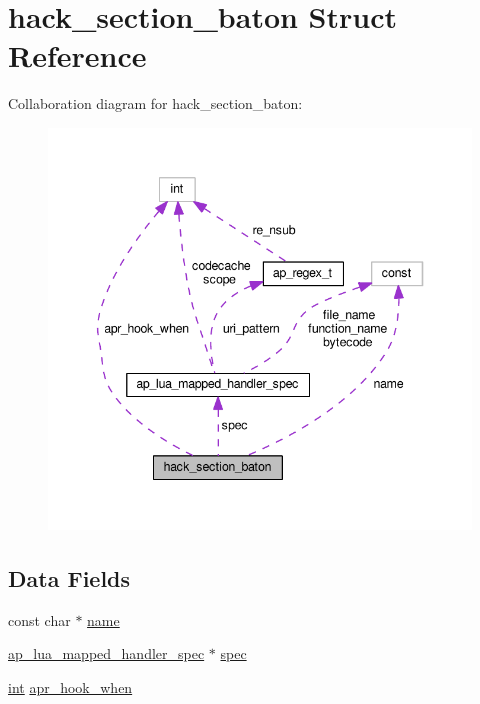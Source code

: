 \hypertarget{structhack__section__baton}{}\section{hack\+\_\+section\+\_\+baton Struct Reference}
\label{structhack__section__baton}


Collaboration diagram for hack\+\_\+section\+\_\+baton\+:
\nopagebreak
\begin{figure}[H]
\begin{center}
\leavevmode
\includegraphics[width=343pt]{structhack__section__baton__coll__graph}
\end{center}
\end{figure}
\subsection*{Data Fields}
\begin{DoxyCompactItemize}
\item 
const char $\ast$ \hyperlink{structhack__section__baton_a1bf2d5dfb68dcda17a887fb0c8b44d94}{name}
\item 
\hyperlink{structap__lua__mapped__handler__spec}{ap\+\_\+lua\+\_\+mapped\+\_\+handler\+\_\+spec} $\ast$ \hyperlink{structhack__section__baton_ae1dfa2c050ede2c788637d40917ebd6a}{spec}
\item 
\hyperlink{pcre_8txt_a42dfa4ff673c82d8efe7144098fbc198}{int} \hyperlink{structhack__section__baton_aa46ffb28500c3e892a61fa60c8373dcf}{apr\+\_\+hook\+\_\+when}
\end{DoxyCompactItemize}


